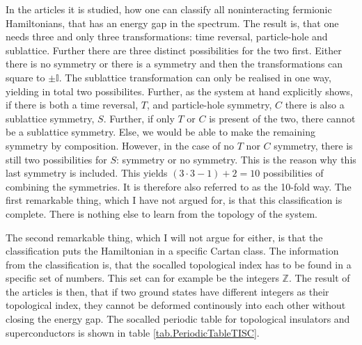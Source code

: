 In the articles \cite{Ludwig.Topology, Chiu.Topology} it is studied, how one can classify all noninteracting fermionic Hamiltonians, that has an energy gap in the spectrum. The result is, that one needs three and only three transformations: time reversal, particle-hole and sublattice. Further there are three distinct possibilities for the two first. Either there is no symmetry or there is a symmetry and then the transformations can square to $\pm \mathbb{I}$. The sublattice transformation can only be realised in one way, yielding in total two possibilites. Further, as the system at hand explicitly shows, if there is both a time reversal, $T$, and particle-hole symmetry, $C$ there is also a sublattice symmetry, $S$. Further, if only $T$ or $C$ is present of the two, there cannot be a sublattice symmetry. Else, we would be able to make the remaining symmetry by composition. However, in the case of no $T$ nor $C$ symmetry, there is still two possibilities for $S$: symmetry or no symmetry. This is the reason why this last symmetry is included. This yields $(3\cdot 3 - 1) + 2 = 10$ possibilities of combining the symmetries. It is therefore also referred to as the 10-fold way. The first remarkable thing, which I have not argued for, is that this classification is complete. There is nothing else to learn from the topology of the system. 

The second remarkable thing, which I will not argue for either, is that the classification puts the Hamiltonian in a specific Cartan class. The information from the classification is, that the socalled topological index has to be found in a specific set of numbers. This set can for example be the integers $\mathbb{Z}$. The result of the articles is then, that if two ground states have different integers as their topological index, they cannot be deformed continously into each other without closing the energy gap. The socalled periodic table for topological insulators and superconductors is shown in table \ref{tab.PeriodicTableTISC}.

